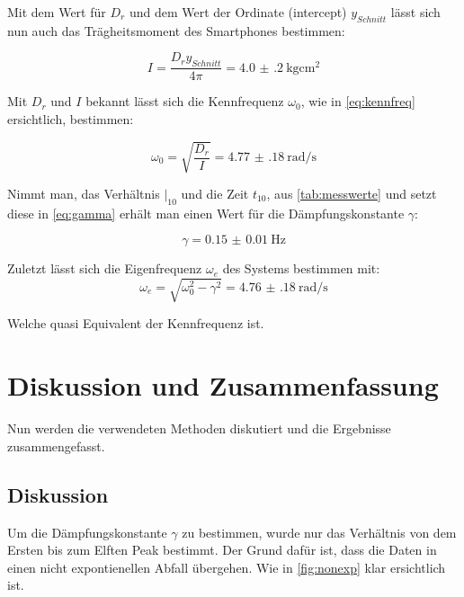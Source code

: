\documentclass[11pt,ngerman]{scrartcl}
\begin{document}
Mit dem Wert für $D_r$ und dem Wert der Ordinate (intercept) $y_{Schnitt}$
lässt sich nun auch das Trägheitsmoment des Smartphones bestimmen:

\begin{equation}
    I = \frac{D_r y_{Schnitt}}{4\pi} = \SI{4.0(2)}{\kg\cm\squared}
\end{equation}

Mit $D_r$ und $I$ bekannt lässt sich die Kennfrequenz $\omega_0$, wie in
\autoref{eq:kennfreq} ersichtlich, bestimmen:

\begin{equation}
    \omega_0 = \sqrt{\frac{D_r}{I}} = \SI{4.77(18)}{\radian\per\second}
\end{equation}

Nimmt man, das Verhältnis $|_{10}$ und die Zeit $t_{10}$, aus
\autoref{tab:messwerte} und setzt diese in \autoref{eq:gamma}
erhält man einen Wert für die Dämpfungskonstante $\gamma$:

\begin{equation}
    \gamma = \SI{0.15(1)}{\hertz}
\end{equation}

Zuletzt lässt sich die Eigenfrequenz $\omega_e$ des Systems bestimmen mit:
\begin{equation}
    \omega_e = \sqrt{\omega_0^2-\gamma^2} = \SI{4.76(18)}{\radian\per\second}
\end{equation}

Welche quasi Equivalent der Kennfrequenz ist.

\section{Diskussion und Zusammenfassung}
\label{sec:diskussion_zusammenfassung}

Nun werden die verwendeten Methoden diskutiert und die Ergebnisse 
zusammengefasst.

\subsection{Diskussion}
Um die Dämpfungskonstante $\gamma$ zu bestimmen, wurde nur
das Verhältnis von dem Ersten bis zum Elften Peak bestimmt.
Der Grund dafür ist, dass die Daten in einen nicht expontienellen
Abfall übergehen. Wie in \autoref{fig:nonexp} klar ersichtlich ist.
\end{document}
